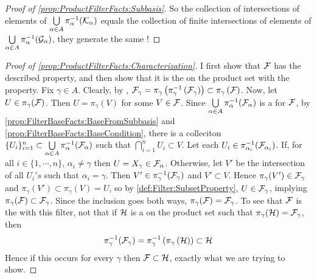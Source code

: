 \begin{prop}
\begin{proof}[Proof of \ref{prop:ProductFilterFacts:Subbasis}]
    So the collection of \Finite intersections of elements 
    of $\bigcup\limits_{\alpha \in A} \pi_{\alpha}^{-1}(\mathcal{K}_\alpha)$ equals the 
    collection of finite intersections of elements of $\bigcup\limits_{\alpha \in A} \pi_{\alpha}^{-1}(\mathcal{G}_\alpha)$, they generate the same \Filter!
\end{proof}
\begin{proof}[Proof of \ref{prop:ProductFilterFacts:Characterization}]
I first show that $\mathcal{F}$ has the described property, 
and then show that it is the \CoarsestFilter on the product set with the property. 
Fix $\gamma \in A$. Clearly, by \Surjectivity, $\mathcal{F}_\gamma = \pi_\gamma\left(  \pi_{\gamma}^{-1} \left( \mathcal{F}_\gamma\right)\right) \subset \pi_{\gamma}\left( \mathcal{F}\right)$. 
Now, let $U \in \pi_{\gamma}(\mathcal{F})$. Then $U=\pi_{\gamma}(V)$ for some $V \in \mathcal{F}$. 
Since $\bigcup\limits_{\alpha \in A} \pi_{\alpha}^{-1}(\mathcal{F}_\alpha)$ is a 
\FilterSubbasis for $\mathcal{F}$, by \ref{prop:FilterBaseFacts:BaseFromSubbasis}
and \ref{prop:FilterBaseFacts:BaseCondition}, there is a
colleciton $\{U_i\}_{i=1}^n \subset \bigcup\limits_{\alpha \in A} \pi_{\alpha}^{-1}(\mathcal{F}_\alpha)$
such that $\bigcap\limits_{i=1}^n U_i \subset V$. 
Let each $U_i \in \pi_{\alpha_i}^{-1}(\mathcal{F}_{\alpha_i})$. 
If, for all $i \in \{1,\cdots,n\}$,
$\alpha_i \neq \gamma$  then $U=X_\gamma \in \mathcal{F}_\alpha$. 
Otherwise, let $V'$ be the intersection of all $U_i's$ such that $\alpha_i=\gamma$. 
Then $V' \in \pi_{\gamma}^{-1}(\mathcal{F}_\gamma)$ and $V' \subset V$. 
Hence $\pi_{\gamma}(V') \in \mathcal{F}_\gamma$ and $\pi_{\gamma}(V') \subset \pi_\gamma(V)=U$, 
so by  \ref{def:Filter:SubsetProperty}, $U \in \mathcal{F}_\gamma$, implying
$\pi_\gamma(\mathcal{F}) \subset \mathcal{F}_\gamma$. 
Since the inclusion goes both ways, $\pi_{\gamma}(\mathcal{F}) = \mathcal{F}_\gamma$. 
To see that $\mathcal{F}$ is the \CoarsestFilter with this filter, not that 
if $\mathcal{H}$ is a \Filter on the product set such that 
$\pi_{\gamma}(\mathcal{H})=\mathcal{F}_\gamma$, then 
\begin{equation*}
\pi_{\gamma}^{-1}(\mathcal{F}_\gamma) = \pi_{\gamma}^{-1}\left( \pi_{\gamma}\left( \mathcal{H}\right)\right) \subset \mathcal{H}
\end{equation*}
Hence if this occurs for every $\gamma$ then $\mathcal{F} \subset \mathcal{H}$, exactly what we are trying to show.

\end{proof}
\end{prop}
